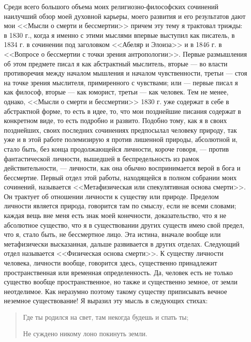 \documentclass[12pt]{article}
\begin{document}
Среди всего большого объема моих религиозно-философских сочинений наилучший обзор моей духовной карьеры, моего развития и его результатов дают мои <<Мысли о смерти и бессмертии>>  причем эту тему я трактовал трижды: в 1830 г., когда я именно с этими мыслями впервые выступил как писатель, в 1834 г. в сочинении под заголовком <<Абеляр и Элоиза>> и в 1846 г. в <<Вопросе о бессмертии с точки зрения антропологии>>. Первые размышления об этом предмете писал я как абстрактный мыслитель, вторые --- во власти противоречия между началом мышления и началом чувственности, третьи --- стоя на точке зрения мыслителя, примиренного с чувствами; или --- первые писал я как философ, вторые --- как юморист, третьи --- как человек. Тем не менее, однако, <<Мысли о смерти и бессмертии>> 1830 г. уже содержат в себе в абстрактной форме, то есть в идее, то, что мои позднейшие писания содержат в конкретном виде, то есть подробно и развито. Подобно тому, как я в своих позднейших, своих последних сочинениях предпосылал человеку природу, так уже и в этой работе полемизирую я против лишенной природы, абсолютной и, стало быть, без конца продолжающейся личности, короче говоря, --- против фантастической личности, вышедшей в беспредельность из рамок действительности, --- личности, как она обычно воспринимается верой в бога и бессмертие. Первый отдел этой работы, находящейся в полном собрании моих сочинений, называется <<Метафизическая или спекулятивная основа смерти>>. Он трактует об отношении личности к существу или природе. Пределом личности является природа, говорится там по смыслу, если не всеми словами; каждая вещь вне меня есть знак моей конечности, доказательство, что я не абсолютное существо, что я в существовании других существ имею свой предел, что я, стало быть, не бессмертное лицо. Эта истина, вначале вообще или метафизически высказанная, дальше развивается в других отделах. Следующий отдел называется <<Физическая основа смерти>>. К существу личности человека, личности вообще, говорится здесь, существенно принадлежит пространственная или временная определенность. Да, человек есть не только существо вообще пространственное, но также и существенно земное, от земли неотделимое. Как неразумно поэтому такому существу приписывать вечное неземное существование! Я выразил эту мысль в следующих стихах: 

\begin{quote}
    
Где ты родился на свет, там некогда будешь и спать ты; 

Не суждено никому лоно покинуть земли. 

\end{quote}
\end{document}
